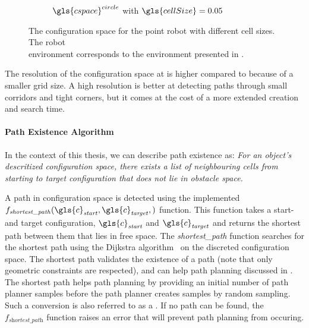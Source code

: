 \begin{figure}[H]
\begin{subfigure}{.49\textwidth}
    \caption{$\gls{cspace}^{circle}$ with $\gls{cellSize} = 0.05$}%
    \label{fig:c_space_two_pushes_smaller}
  \end{subfigure}
  \caption{The configuration space for the point robot with different cell sizes. The robot\\environment corresponds to the environment presented in .}
  \label{fig:two_pushes_to_freedom_conf_space}
\end{figure}

The resolution of the configuration space at  is higher compared to  because of a smaller grid size. A high resolution is better at detecting paths through small corridors and tight corners, but it comes at the cost of a more extended creation and search time.

\paragraph{Path Existence Algorithm} In the context of this thesis, we can describe path existence as: \textit{For an object's descritized configuration space, there exists a list of neighbouring cells from starting to target configuration that does not lie in obstacle space.\bs}

A path in configuration space is detected using the implemented\\$f_\mathit{shortest\_path}(\gls{c}_\mathit{start}, \gls{c}_\mathit{target}, )$ function. This function takes a start- and target configuration, $\gls{c}_\mathit{start}$ and $\gls{c}_\mathit{target}$ and returns the shortest path between them that lies in free space. The \textit{shortest\_path} function searches for the shortest path using the Dijkstra algorithm~\cite{dijkstra_note_1959} on the discreted configuration space. The shortest path validates the existence of a path (note that only geometric constraints are respected), and can help path planning discussed in . The shortest path helps path planning by providing an initial number of path planner samples before the path planner creates samples by random sampling. Such a conversion is also referred to as a . If no path can be found, the $f_\textit{shortest\_path}$ function raises an error that will prevent path planning from occuring.\bs

